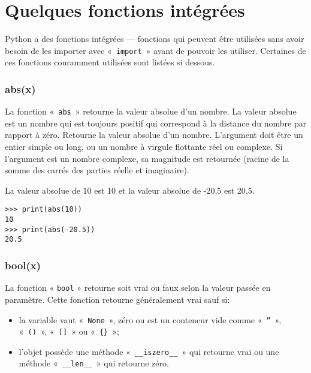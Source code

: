 



\chapter{Quelques fonctions intégrées}\label{app:fonctionsintégrées}

Python a des fonctions intégrées --- fonctions qui peuvent être utilisées sans avoir besoin de les importer avec « \texttt{import} »  avant de pouvoir les utiliser. Certaines de ces fonctions couramment  utilisées sont listées si dessous.

\subsection*{abs(x)}

La fonction « \texttt{abs} » retourne la valeur absolue d'un nombre. La valeur absolue est un nombre qui est toujours positif qui correspond à la distance du nombre par rapport à zéro. Retourne la valeur absolue d'un nombre. L'argument doit être un entier simple ou long, ou un nombre à virgule flottante réel ou complexe. Si l'argument est un nombre complexe, sa magnitude est retournée (racine de la somme des carrés des parties réelle et imaginaire).

La valeur absolue de 10 est 10 et la valeur absolue de -20,5 est 20,5. 
\begin{Verbatim}[frame=single,rulecolor=\color{gray}]
>>> print(abs(10))
10
>>> print(abs(-20.5))
20.5
\end{Verbatim}

\subsection*{bool(x)}

La fonction « \texttt{bool} » retourne soit vrai ou faux selon la valeur passée en paramètre. Cette fonction retourne généralement vrai  sauf si:
\begin{itemize}
\item la variable vaut  « \texttt{None} », zéro ou est un conteneur vide comme « \texttt{''} », « \texttt{()} »,  « \texttt{[]} » ou « \texttt{\{\}} »;
\item l'objet possède une méthode « \texttt{\_\_iszero\_\_} » qui retourne vrai ou une méthode « \texttt{\_\_len\_\_} » qui retourne zéro.
\end{itemize}

